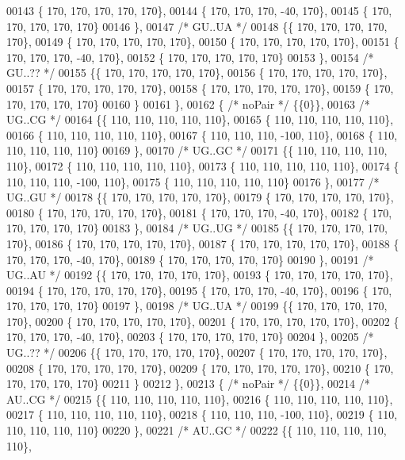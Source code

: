 \begin{DoxyCode}
00143 \{ 170, 170, 170, 170, 170\},
00144 \{ 170, 170, 170, -40, 170\},
00145 \{ 170, 170, 170, 170, 170\}
00146 \},
00147 \textcolor{comment}{/* GU..UA */}
00148 \{\{ 170, 170, 170, 170, 170\},
00149 \{ 170, 170, 170, 170, 170\},
00150 \{ 170, 170, 170, 170, 170\},
00151 \{ 170, 170, 170, -40, 170\},
00152 \{ 170, 170, 170, 170, 170\}
00153 \},
00154 \textcolor{comment}{/* GU..?? */}
00155 \{\{ 170, 170, 170, 170, 170\},
00156 \{ 170, 170, 170, 170, 170\},
00157 \{ 170, 170, 170, 170, 170\},
00158 \{ 170, 170, 170, 170, 170\},
00159 \{ 170, 170, 170, 170, 170\}
00160 \}
00161 \},
00162 \{ \textcolor{comment}{/* noPair */} \{\{0\}\},
00163 \textcolor{comment}{/* UG..CG */}
00164 \{\{ 110, 110, 110, 110, 110\},
00165 \{ 110, 110, 110, 110, 110\},
00166 \{ 110, 110, 110, 110, 110\},
00167 \{ 110, 110, 110, -100, 110\},
00168 \{ 110, 110, 110, 110, 110\}
00169 \},
00170 \textcolor{comment}{/* UG..GC */}
00171 \{\{ 110, 110, 110, 110, 110\},
00172 \{ 110, 110, 110, 110, 110\},
00173 \{ 110, 110, 110, 110, 110\},
00174 \{ 110, 110, 110, -100, 110\},
00175 \{ 110, 110, 110, 110, 110\}
00176 \},
00177 \textcolor{comment}{/* UG..GU */}
00178 \{\{ 170, 170, 170, 170, 170\},
00179 \{ 170, 170, 170, 170, 170\},
00180 \{ 170, 170, 170, 170, 170\},
00181 \{ 170, 170, 170, -40, 170\},
00182 \{ 170, 170, 170, 170, 170\}
00183 \},
00184 \textcolor{comment}{/* UG..UG */}
00185 \{\{ 170, 170, 170, 170, 170\},
00186 \{ 170, 170, 170, 170, 170\},
00187 \{ 170, 170, 170, 170, 170\},
00188 \{ 170, 170, 170, -40, 170\},
00189 \{ 170, 170, 170, 170, 170\}
00190 \},
00191 \textcolor{comment}{/* UG..AU */}
00192 \{\{ 170, 170, 170, 170, 170\},
00193 \{ 170, 170, 170, 170, 170\},
00194 \{ 170, 170, 170, 170, 170\},
00195 \{ 170, 170, 170, -40, 170\},
00196 \{ 170, 170, 170, 170, 170\}
00197 \},
00198 \textcolor{comment}{/* UG..UA */}
00199 \{\{ 170, 170, 170, 170, 170\},
00200 \{ 170, 170, 170, 170, 170\},
00201 \{ 170, 170, 170, 170, 170\},
00202 \{ 170, 170, 170, -40, 170\},
00203 \{ 170, 170, 170, 170, 170\}
00204 \},
00205 \textcolor{comment}{/* UG..?? */}
00206 \{\{ 170, 170, 170, 170, 170\},
00207 \{ 170, 170, 170, 170, 170\},
00208 \{ 170, 170, 170, 170, 170\},
00209 \{ 170, 170, 170, 170, 170\},
00210 \{ 170, 170, 170, 170, 170\}
00211 \}
00212 \},
00213 \{ \textcolor{comment}{/* noPair */} \{\{0\}\},
00214 \textcolor{comment}{/* AU..CG */}
00215 \{\{ 110, 110, 110, 110, 110\},
00216 \{ 110, 110, 110, 110, 110\},
00217 \{ 110, 110, 110, 110, 110\},
00218 \{ 110, 110, 110, -100, 110\},
00219 \{ 110, 110, 110, 110, 110\}
00220 \},
00221 \textcolor{comment}{/* AU..GC */}
00222 \{\{ 110, 110, 110, 110, 110\},

\end{DoxyCode}
